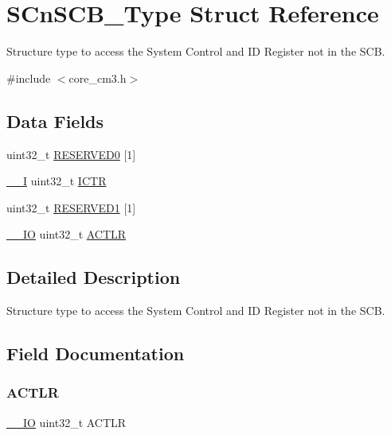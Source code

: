 \hypertarget{struct_s_cn_s_c_b___type}{}\section{S\+Cn\+S\+C\+B\+\_\+\+Type Struct Reference}
\label{struct_s_cn_s_c_b___type}


Structure type to access the System Control and ID Register not in the S\+CB.  




{\ttfamily \#include $<$core\+\_\+cm3.\+h$>$}

\subsection*{Data Fields}
\begin{DoxyCompactItemize}
\item 
uint32\+\_\+t \mbox{\hyperlink{struct_s_cn_s_c_b___type_a3bc109a372d05329e22cb7e3bf2b84ba}{R\+E\+S\+E\+R\+V\+E\+D0}} \mbox{[}1\mbox{]}
\item 
\mbox{\hyperlink{core__sc300_8h_af63697ed9952cc71e1225efe205f6cd3}{\+\_\+\+\_\+I}} uint32\+\_\+t \mbox{\hyperlink{struct_s_cn_s_c_b___type_a5bb2c6795b90f12077534825cc844b56}{I\+C\+TR}}
\item 
uint32\+\_\+t \mbox{\hyperlink{struct_s_cn_s_c_b___type_a9b85a62ba1c4cf0e4ca2b1ff8e5bc85c}{R\+E\+S\+E\+R\+V\+E\+D1}} \mbox{[}1\mbox{]}
\item 
\mbox{\hyperlink{core__sc300_8h_aec43007d9998a0a0e01faede4133d6be}{\+\_\+\+\_\+\+IO}} uint32\+\_\+t \mbox{\hyperlink{struct_s_cn_s_c_b___type_a9a73f00a0223775caeb09c5c6abb3087}{A\+C\+T\+LR}}
\end{DoxyCompactItemize}


\subsection{Detailed Description}
Structure type to access the System Control and ID Register not in the S\+CB. 

\subsection{Field Documentation}
\mbox{\label{struct_s_cn_s_c_b___type_a9a73f00a0223775caeb09c5c6abb3087}} 
\subsubsection{\texorpdfstring{ACTLR}{ACTLR}}
{\footnotesize\ttfamily \mbox{\hyperlink{core__sc300_8h_aec43007d9998a0a0e01faede4133d6be}{\+\_\+\+\_\+\+IO}} uint32\+\_\+t A\+C\+T\+LR}

